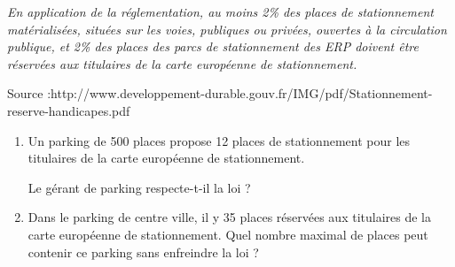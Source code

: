 
\textit{En application de la réglementation, au moins 2\% des places de stationnement matérialisées, situées sur les voies, publiques ou privées, ouvertes à la circulation publique, et 2\% des places des parcs de stationnement des ERP doivent être réservées aux titulaires de la carte européenne de stationnement.}
\begin{tiny}
\hfill{Source :http://www.developpement-durable.gouv.fr/IMG/pdf/Stationnement-reserve-handicapes.pdf}
\end{tiny}

\begin{enumerate}
\item Un parking de 500 places propose 12 places de stationnement pour les titulaires de la carte européenne de stationnement.

Le gérant de parking respecte-t-il la loi ?

\item Dans le parking de centre ville, il y 35 places réservées aux titulaires de la carte européenne de stationnement. Quel nombre maximal de places peut contenir ce parking sans enfreindre la loi ?
\end{enumerate}
